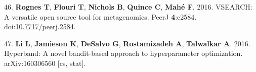 \documentclass[11pt,]{article}
\begin{document}
\hypertarget{ref-rognes_vsearch_2016}{}
46. \textbf{Rognes T}, \textbf{Flouri T}, \textbf{Nichols B},
\textbf{Quince C}, \textbf{Mahé F}. 2016. VSEARCH: A versatile open
source tool for metagenomics. PeerJ \textbf{4}:e2584.
doi:\href{https://doi.org/10.7717/peerj.2584}{10.7717/peerj.2584}.

\hypertarget{ref-li_hyperband:_2016}{}
47. \textbf{Li L}, \textbf{Jamieson K}, \textbf{DeSalvo G},
\textbf{Rostamizadeh A}, \textbf{Talwalkar A}. 2016. Hyperband: A novel
bandit-based approach to hyperparameter optimization. arXiv:160306560
{[}cs, stat{]}.
\end{document}
